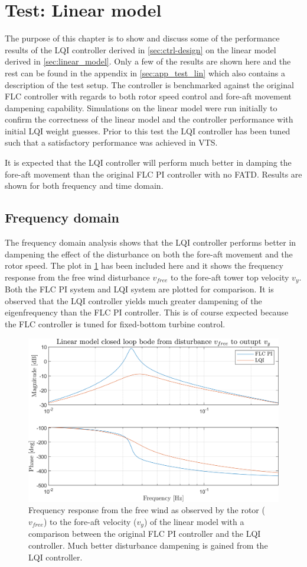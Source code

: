 \section{Test: Linear model} \label{sec:test_lin}
The purpose of this chapter is to show and discuss some of the performance results of the LQI controller derived in \cref{sec:ctrl-design} on the linear model derived in \cref{sec:linear_model}. Only a few of the results are shown here and the rest can be found in the appendix in \cref{sec:app_test_lin} which also contains a description of the test setup. The controller is benchmarked against the original FLC controller with regards to both rotor speed control and fore-aft movement dampening capability. Simulations on the linear model were run initially to confirm the correctness of the linear model and the controller performance with initial LQI weight guesses. Prior to this test the LQI controller has been tuned such that a satisfactory performance was achieved in VTS.

It is expected that the LQI controller will perform much better in damping the fore-aft movement than the original FLC PI controller with no FATD. Results are shown for both frequency and time domain.


\subsection{Frequency domain}
The frequency domain analysis shows that the LQI controller performs better in dampening the effect of the disturbance on both the fore-aft movement and the rotor speed. The plot in \cref{fig:script_vfreeTovy} has been included here and it shows the frequency response from the free wind disturbance $ v_{free} $ to the fore-aft tower top velocity $ v_y $. Both the FLC PI system and LQI system are plotted for comparison. It is observed that the LQI controller yields much greater dampening of the eigenfrequency than the FLC PI controller. This is of course expected because the FLC controller is tuned for fixed-bottom turbine control.
\begin{figure}[ht]
	\centering
	\includegraphics[width=0.7\linewidth]{Graphics/TestResults/linearModPerf/script_vfreeTovy.png}
	\caption{Frequency response from the free wind as observed by the rotor ($ v_{free} $) to the fore-aft velocity ($ v_y $) of the linear model with a comparison between the original FLC PI controller and the LQI controller. Much better disturbance dampening is gained from the LQI controller.}
	\label{fig:script_vfreeTovy}
\end{figure}


